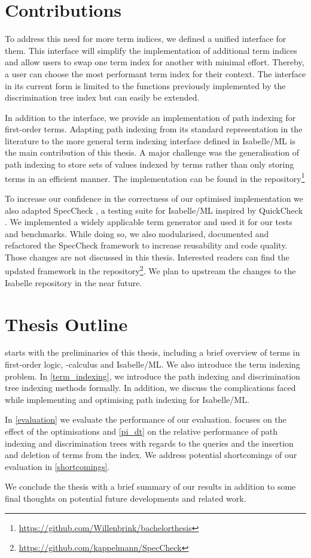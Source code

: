 \section{Contributions}
To address this need for more term indices, we defined a unified interface for them. This interface will simplify the implementation of additional term indices and allow users to swap one term index for another with minimal effort. Thereby, a user can choose the most performant term index for their context.
The interface in its current form is limited to the functions previously implemented by the discrimination tree index but can easily be extended.

In addition to the interface, we provide an implementation of path indexing for first-order terms. Adapting path indexing from its standard representation in the literature to the more general term indexing interface defined in Isabelle/ML is the main contribution of this thesis.
A major challenge was the generalisation of path indexing to store sets of values indexed by terms rather than only storing terms in an efficient manner. The implementation can be found in the repository\footnote{\url{https://github.com/Willenbrink/bachelorthesis}}

To increase our confidence in the correctness of our optimised implementation we also adapted SpecCheck \cite{bulwahn_new_2012}, a testing suite for Isabelle/ML inspired by QuickCheck \cite{claessen_quickcheck_2011}.
We implemented a widely applicable term generator and used it for our tests and benchmarks.
While doing so, we also modularised, documented and refactored the SpecCheck framework to increase reusability and code quality.
Those changes are not discussed in this thesis.
Interested readers can find the updated framework in the repository\footnote{\url{https://github.com/kappelmann/SpecCheck}}.
We plan to upstream the changes to the Isabelle repository in the near future.

\section{Thesis Outline}
 starts with the preliminaries of this thesis, including a brief overview of terms in first-order logic, \lam -calculus and Isabelle/ML. We also introduce the term indexing problem. In \cref{term_indexing}, we introduce the path indexing and discrimination tree indexing methods formally. In addition, we discuss the complications faced while implementing and optimising path indexing for Isabelle/ML.

In \cref{evaluation} we evaluate the performance of our evaluation.  focuses on the effect of the optimisations and \cref{pi_dt} on the relative performance of path indexing and discrimination trees with regards to the queries and the insertion and deletion of terms from the index. We address potential shortcomings of our evaluation in \cref{shortcomings}.

We conclude the thesis with a brief summary of our results in addition to some final thoughts on potential future developments and related work.
